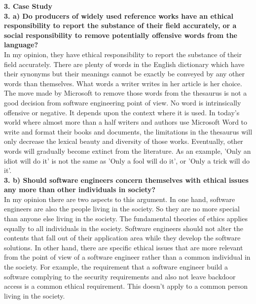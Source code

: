 \documentclass [12pt, a4paper]{article}
\begin{document}
\large
\textbf{3. Case Study}\\
\normalsize
\textbf{3. a) Do producers of widely used reference works have an ethical responsibility to report the substance of their field accurately, or a social responsibility to remove potentially offensive words from the language?}\\
In my opinion, they have ethical responsibility to report the substance of their field accurately. There are plenty of words in the English dictionary which have their synonyms but their meanings cannot be exactly be conveyed by any other words than themselves. What words a writer writes in her article is her choice. The move made by Microsoft to remove those words from the thesaurus is not a good decision from software engineering point of view. No word is intrinsically offensive or negative. It depends upon the context where it is used. In today's world where almost more than a half writers and authors use Microsoft Word to write and format their books and documents, the limitations in the thesaurus will only decrease the lexical beauty and diversity of those works. Eventually, other words will gradually become extinct from the literature. As an example, 'Only an idiot will do it' is not the same as 'Only a fool will do it', or 'Only a trick will do it'. \\

\textbf{3. b) Should software engineers concern themselves with ethical issues any more than other individuals in society?}\\
In my opinion there are two aspects to this argument. In one hand, software engineers are also the people living in the society. So they are no more special than anyone else living in the society. The fundamental theories of ethics applies equally to all individuals in the society. Software engineers should not alter the contents that fall out of their application area while they develop the software solutions. In other hand, there are specific ethical issues that are more relevant from the point of view of a software engineer rather than a common individual in the society. For example, the requirement that a software engineer build a software complying to the security requirements and also not leave backdoor access is a common ethical requirement. This doesn't apply to a common person living in the society.\\
\end{document}
